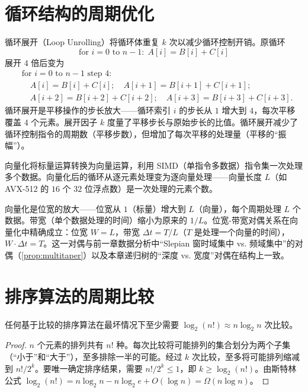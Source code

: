 \section{循环结构的周期优化}

\begin{definition}[循环展开]\label{def:loop_unrolling}
循环展开（Loop Unrolling）将循环体重复 $k$ 次以减少循环控制开销。原循环
\[
\text{for } i = 0 \text{ to } n-1: \; A[i] = B[i] + C[i]
\]
展开 $4$ 倍后变为
\[
\begin{aligned}
&\text{for } i = 0 \text{ to } n-1 \text{ step } 4: \\
&\quad A[i] = B[i] + C[i]; \quad A[i+1] = B[i+1] + C[i+1]; \\
&\quad A[i+2] = B[i+2] + C[i+2]; \quad A[i+3] = B[i+3] + C[i+3].
\end{aligned}
\]
循环展开是平移操作的步长放大——循环索引 $i$ 的步长从 $1$ 增大到 $4$，每次平移覆盖 $4$ 个元素。展开因子 $k$ 度量了平移步长与原始步长的比值。循环展开减少了循环控制指令的周期数（平移步数），但增加了每次平移的处理量（平移的“振幅”）。
\end{definition}

\begin{definition}[向量化]\label{def:vectorization}
向量化将标量运算转换为向量运算，利用 SIMD（单指令多数据）指令集一次处理多个数据。向量化后的循环从逐元素处理变为逐向量处理——向量长度 $L$（如 AVX-512 的 $16$ 个 $32$ 位浮点数）是一次处理的元素个数。

向量化是位宽的放大——位宽从 $1$（标量）增大到 $L$（向量），每个周期处理 $L$ 个数据。带宽（单个数据处理的时间）缩小为原来的 $1/L$。位宽-带宽对偶关系在向量化中精确成立：位宽 $W = L$，带宽 $\Delta t = T/L$（$T$ 是处理一个向量的时间），$W \cdot \Delta t = T$。这一对偶与前一章数据分析中“Slepian 窗时域集中 vs. 频域集中”的对偶（\cref{prop:multitaper}）以及本章递归树的“深度 vs. 宽度”对偶在结构上一致。
\end{definition}

\section{排序算法的周期比较}

\begin{theorem}[比较排序的周期下界]\label{thm:sorting_lower_bound}
任何基于比较的排序算法在最坏情况下至少需要 $\log_2(n!) \approx n \log_2 n$ 次比较。
\end{theorem}

\begin{proof}
$n$ 个元素的排列共有 $n!$ 种。每次比较将可能排列的集合划分为两个子集（“小于”和“大于”），至多排除一半的可能。经过 $k$ 次比较，至多将可能排列缩减到 $n!/2^k$。要唯一确定排序结果，需要 $n!/2^k \le 1$，即 $k \ge \log_2(n!)$。由斯特林公式 $\log_2(n!) = n \log_2 n - n \log_2 e + O(\log n) = \Omega(n \log n)$。
\end{proof}

